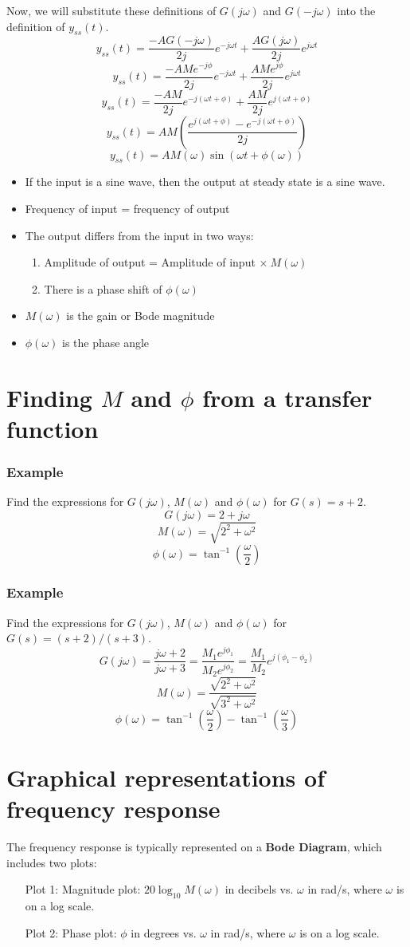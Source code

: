 \documentclass{book}
\newcommand{\jw}{j\omega}
\newcommand{\wt}{\omega t}
\newcommand{\exmp}{\subsubsection*{Example}}
\begin{document}
Now, we will substitute these definitions of $ G(\jw) $ and $ G(-\jw) $ into the definition of $ y_{ss}(t) $.
\[ y_{ss}(t) = \frac{-AG(-\jw)}{2j} e^{-j\wt} + \frac{AG(\jw)}{2j} e^{j\wt} \]
\[ y_{ss}(t) = \frac{-AMe^{-j\phi}}{2j} e^{-j\wt} + \frac{AMe^{j\phi}}{2j} e^{j\wt} \]
\[ y_{ss}(t) = \frac{-AM}{2j} e^{-j(\wt+\phi)} + \frac{AM}{2j} e^{j(\wt+\phi)} \]
\[ y_{ss}(t) = AM\left( \frac{e^{j(\wt+\phi)}-e^{-j(\wt+\phi)}}{2j} \right) \]
\[ \boxed{y_{ss}(t) = AM(\omega)\sin\left(\wt+\phi(\omega)\right)} \]
\begin{itemize}
	\item If the input is a sine wave, then the output at steady state is a sine wave.
	\item Frequency of input = frequency of output
	\item The output differs from the input in two ways:
	\begin{enumerate}
		\item Amplitude of output = Amplitude of input $ \times\ M(\omega) $
		\item There is a phase shift of $ \phi(\omega) $
	\end{enumerate}
	\item $ M(\omega) $ is the gain or Bode magnitude
	\item $ \phi(\omega) $ is the phase angle
\end{itemize}

\section*{Finding $ M $ and $ \phi $ from a transfer function}
\exmp
Find the expressions for $ G(\jw) $, $ M(\omega) $ and $ \phi(\omega) $ for $ G(s) = s+2 $.
\[ G(\jw)=2+\jw \]
\[ M(\omega) = \sqrt{2^2+\omega^2} \]
\[ \phi(\omega) = \tan^{-1}\left(\frac{\omega}{2}\right) \]

\exmp
Find the expressions for $ G(\jw) $, $ M(\omega) $ and $ \phi(\omega) $ for $ G(s) = (s+2)/(s+3) $.
\[ G(\jw)=\frac{\jw+2}{\jw+3}=\frac{M_1e^{j\phi_1}}{M_2e^{j\phi_2}}=\frac{M_1}{M_2}e^{j(\phi_1-\phi_2)} \]
\[ M(\omega) = \frac{\sqrt{2^2+\omega^2}}{\sqrt{3^2+\omega^2}} \]
\[ \phi(\omega) = \tan^{-1}\left(\frac{\omega}{2}\right) - \tan^{-1}\left(\frac{\omega}{3}\right) \]

\section*{Graphical representations of frequency response}
The frequency response is typically represented on a \textbf{Bode Diagram}, which includes two plots:
\begin{enumerate}
	\item[Plot 1:] Magnitude plot: $ 20\log_{10}M(\omega) $ in decibels vs. $ \omega $ in rad/s, where $ \omega $ is on a log scale.
	\item[Plot 2:] Phase plot: $ \phi $ in degrees vs. $ \omega $ in rad/s, where $ \omega $ is on a log scale.
\end{enumerate}
\end{document}

